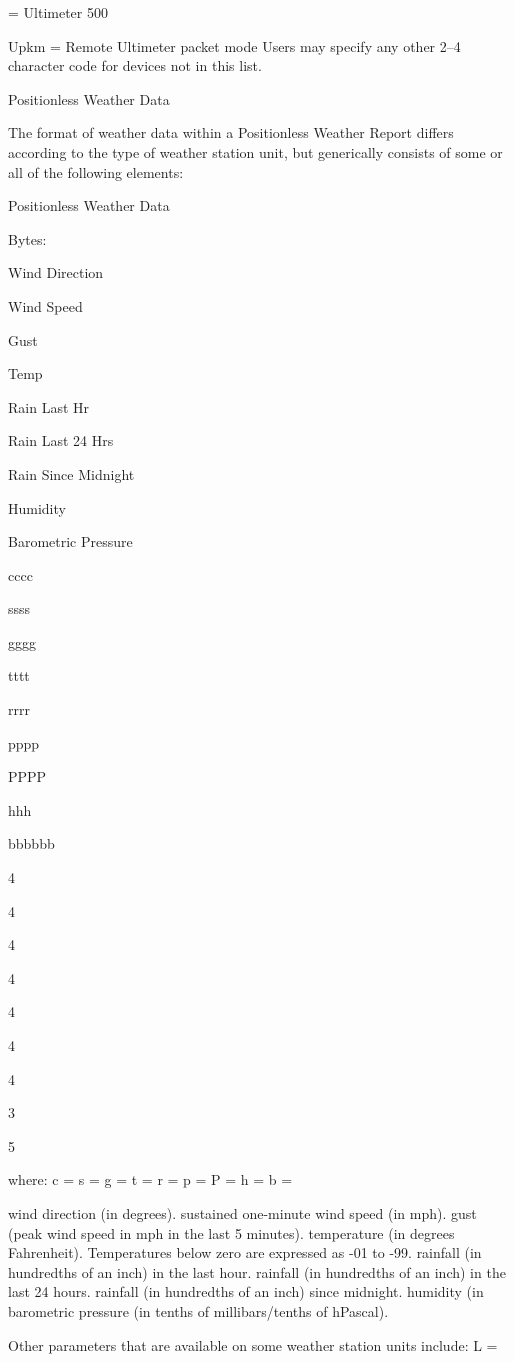 = Ultimeter 500

Upkm = Remote Ultimeter packet mode
Users may specify any other 2–4 character code for devices not in this list.


Positionless Weather Data

The format of weather data within a Positionless Weather Report differs
according to the type of weather station unit, but generically consists of some
or all of the following elements:

Positionless Weather Data

Bytes:

Wind
Direction

Wind
Speed

Gust

Temp

Rain
Last Hr

Rain
Last 24 Hrs

Rain
Since Midnight

Humidity

Barometric
Pressure

cccc

ssss

gggg

tttt

rrrr

pppp

PPPP

hhh

bbbbbb

4

4

4

4

4

4

4

3

5

where: c =
s =
g =
t =
r =
p =
P =
h =
b =

wind direction (in degrees).
sustained one-minute wind speed (in mph).
gust (peak wind speed in mph in the last 5 minutes).
temperature (in degrees Fahrenheit). Temperatures below
zero are expressed as -01 to -99.
rainfall (in hundredths of an inch) in the last hour.
rainfall (in hundredths of an inch) in the last 24 hours.
rainfall (in hundredths of an inch) since midnight.
humidity (in %
barometric pressure (in tenths of millibars/tenths of hPascal).

Other parameters that are available on some weather station units include:
L =

